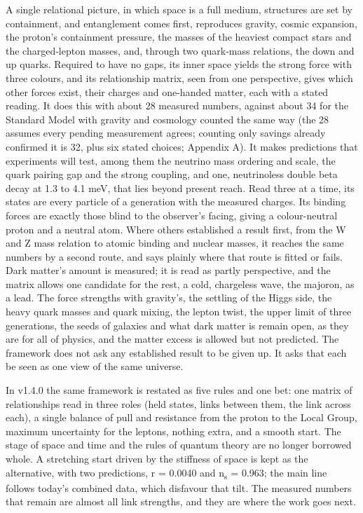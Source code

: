 \documentclass[
  11pt,
]{article}
\begin{document}
A single relational picture, in which space is a full medium, structures are set by containment, and entanglement comes first, reproduces gravity, cosmic expansion, the proton's containment pressure, the masses of the heaviest compact stars and the charged-lepton masses, and, through two quark-mass relations, the down and up quarks. Required to have no gaps, its inner space yields the strong force with three colours, and its relationship matrix, seen from one perspective, gives which other forces exist, their charges and one-handed matter, each with a stated reading. It does this with about 28 measured numbers, against about 34 for the Standard Model with gravity and cosmology counted the same way (the 28 assumes every pending measurement agrees; counting only savings already confirmed it is 32, plus six stated choices; Appendix A). It makes predictions that experiments will test, among them the neutrino mass ordering and scale, the quark pairing gap and the strong coupling, and one, neutrinoless double beta decay at 1.3 to 4.1 meV, that lies beyond present reach. Read three at a time, its states are every particle of a generation with the measured charges. Its binding forces are exactly those blind to the observer's facing, giving a colour-neutral proton and a neutral atom. Where others established a result first, from the W and Z mass relation to atomic binding and nuclear masses, it reaches the same numbers by a second route, and says plainly where that route is fitted or fails. Dark matter's amount is measured; it is read as partly perspective, and the matrix allows one candidate for the rest, a cold, chargeless wave, the majoron, as a lead. The force strengths with gravity's, the settling of the Higgs side, the heavy quark masses and quark mixing, the lepton twist, the upper limit of three generations, the seeds of galaxies and what dark matter is remain open, as they are for all of physics, and the matter excess is allowed but not predicted. The framework does not ask any established result to be given up. It asks that each be seen as one view of the same universe.

In v1.4.0 the same framework is restated as five rules and one bet: one matrix of relationships read in three roles (held states, links between them, the link across each), a single balance of pull and resistance from the proton to the Local Group, maximum uncertainty for the leptons, nothing extra, and a smooth start. The stage of space and time and the rules of quantum theory are no longer borrowed whole. A stretching start driven by the stiffness of space is kept as the alternative, with two predictions, r = 0.0040 and n\textsubscript{s} = 0.963; the main line follows today's combined data, which disfavour that tilt. The measured numbers that remain are almost all link strengths, and they are where the work goes next.
\end{document}
